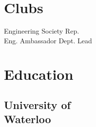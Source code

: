 \documentclass[]{chandan-cv}
\begin{document}
\begin{minipage}[t]{0.27\textwidth}

\section{Clubs}
Engineering Society Rep.\\
Eng. Ambassador Dept. Lead
\sectionsep



\section{Education}

\subsection{University of \\
Waterloo}
\sectionsep


%
%

\end{minipage}
\hfill
\end{document}
